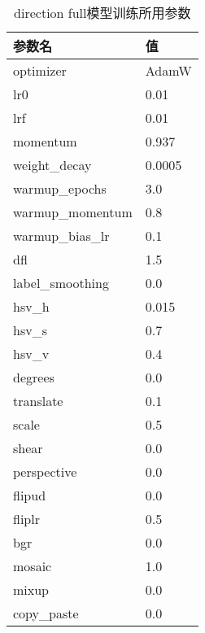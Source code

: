   
  \begin{table}
    \centering
  \begin{tabular}{ll}\toprule
     参数名&值\\\midrule
     optimizer&AdamW\\
     lr0& 0.01\\
     lrf& 0.01\\
     momentum& 0.937\\
     weight\_decay& 0.0005\\
     warmup\_epochs& 3.0\\
     warmup\_momentum& 0.8\\
     warmup\_bias\_lr& 0.1\\
     dfl& 1.5\\
     label\_smoothing& 0.0\\
   
     hsv\_h& 0.015\\
     hsv\_s& 0.7\\
     hsv\_v& 0.4\\
     degrees& 0.0\\
     translate& 0.1\\
     scale& 0.5\\
     shear& 0.0\\
     perspective& 0.0\\
     flipud& 0.0\\
     fliplr& 0.5\\
     bgr& 0.0\\
     mosaic& 1.0\\
     mixup& 0.0\\
     copy\_paste& 0.0\\
     \bottomrule
    \end{tabular}
    \caption{direction full模型训练所用参数}
    \end{table}

